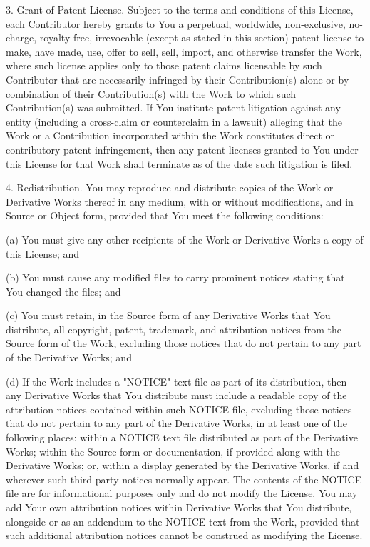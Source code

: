 \documentclass[10pt]{article}
\begin{document}
   3. Grant of Patent License. Subject to the terms and conditions of
      this License, each Contributor hereby grants to You a perpetual,
      worldwide, non-exclusive, no-charge, royalty-free, irrevocable
      (except as stated in this section) patent license to make, have made,
      use, offer to sell, sell, import, and otherwise transfer the Work,
      where such license applies only to those patent claims licensable
      by such Contributor that are necessarily infringed by their
      Contribution(s) alone or by combination of their Contribution(s)
      with the Work to which such Contribution(s) was submitted. If You
      institute patent litigation against any entity (including a
      cross-claim or counterclaim in a lawsuit) alleging that the Work
      or a Contribution incorporated within the Work constitutes direct
      or contributory patent infringement, then any patent licenses
      granted to You under this License for that Work shall terminate
      as of the date such litigation is filed.

   4. Redistribution. You may reproduce and distribute copies of the
      Work or Derivative Works thereof in any medium, with or without
      modifications, and in Source or Object form, provided that You
      meet the following conditions:

      (a) You must give any other recipients of the Work or
          Derivative Works a copy of this License; and

      (b) You must cause any modified files to carry prominent notices
          stating that You changed the files; and

      (c) You must retain, in the Source form of any Derivative Works
          that You distribute, all copyright, patent, trademark, and
          attribution notices from the Source form of the Work,
          excluding those notices that do not pertain to any part of
          the Derivative Works; and

      (d) If the Work includes a "NOTICE" text file as part of its
          distribution, then any Derivative Works that You distribute must
          include a readable copy of the attribution notices contained
          within such NOTICE file, excluding those notices that do not
          pertain to any part of the Derivative Works, in at least one
          of the following places: within a NOTICE text file distributed
          as part of the Derivative Works; within the Source form or
          documentation, if provided along with the Derivative Works; or,
          within a display generated by the Derivative Works, if and
          wherever such third-party notices normally appear. The contents
          of the NOTICE file are for informational purposes only and
          do not modify the License. You may add Your own attribution
          notices within Derivative Works that You distribute, alongside
          or as an addendum to the NOTICE text from the Work, provided
          that such additional attribution notices cannot be construed
          as modifying the License.
\end{document}
